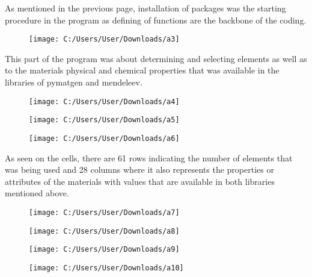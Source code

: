 \documentclass[12pt]{article}
\begin{document}
As mentioned in the previous page, installation of packages was the starting procedure in the program as defining of functions are the backbone of the coding.\\
\vspace{-10mm}
\begin{figure}[h!]
	\centering
	\texttt{[image: C:/Users/User/Downloads/a3]}
\end{figure}
\vspace{-6mm}

This part of the program was about determining and selecting elements as well as to the materials physical and chemical properties that was available in the libraries of pymatgen and mendeleev.\\

\newpage
\vspace{-10mm}
\begin{figure}[h!]
	\centering
	\texttt{[image: C:/Users/User/Downloads/a4]}
\end{figure}
\vspace{-10mm}
\begin{figure}[h!]
	\centering
	\texttt{[image: C:/Users/User/Downloads/a5]}
\end{figure}
\vspace{-10mm}
\begin{figure}[h!]
	\centering
	\texttt{[image: C:/Users/User/Downloads/a6]}
\end{figure}
\vspace{-6mm}
As seen on the cells, there are 61 rows indicating the number of elements that was being used and 28 columns where it also represents the properties or attributes of the materials with values that are available in both libraries mentioned above.\\

\newpage
\vspace{-10mm}
\begin{figure}[h!]
	\centering
	\texttt{[image: C:/Users/User/Downloads/a7]}
\end{figure}
\vspace{-10mm}
\begin{figure}[h!]
	\centering
	\texttt{[image: C:/Users/User/Downloads/a8]}
\end{figure}
\vspace{-10mm}
\begin{figure}[h!]
	\centering
	\texttt{[image: C:/Users/User/Downloads/a9]}
\end{figure}
\vspace{-10mm}
\begin{figure}[h!]
	\centering
	\texttt{[image: C:/Users/User/Downloads/a10]}
\end{figure}
\vspace{-6mm}
\end{document}
